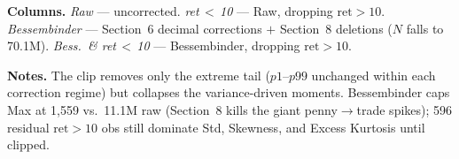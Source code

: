 \documentclass[11pt]{article}
\begin{document}
\smallskip
\noindent
\textbf{Columns.}
\emph{Raw} --- uncorrected.
\emph{ret\,$<$\,10} --- Raw, dropping $\mathrm{ret}>10$.
\emph{Bessembinder} --- Section~6 decimal corrections $+$ Section~8 deletions
($N$ falls to 70.1M).
\emph{Bess.\ \& ret\,$<$\,10} --- Bessembinder, dropping $\mathrm{ret}>10$.

\smallskip
\noindent
\textbf{Notes.} The clip removes only the extreme tail ($p1$--$p99$ unchanged
within each correction regime) but collapses the variance-driven moments.
Bessembinder caps Max at 1{,}559 vs.\ 11.1M raw (Section~8 kills the giant
penny$\to$trade spikes); 596 residual $\mathrm{ret}>10$ obs still dominate Std,
Skewness, and Excess Kurtosis until clipped.
\normalsize
\end{document}
